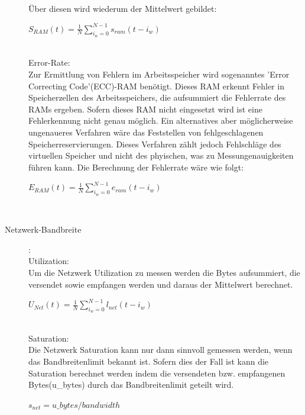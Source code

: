 \documentclass[a4paper,10pt]{scrartcl}
\begin{document}
\begin{description}
Über diesen wird wiederum der Mittelwert gebildet:\\

\begin{Huge}
\(
\displaystyle{S_{RAM}(t)=\frac{1}{N}{\sum\limits_{i_{w}=0}^{N-1} s_{ram}{(t-i_{w})}} }
\) 
\end{Huge}\\

Error-Rate:\\
Zur Ermittlung von Fehlern im Arbeitsspeicher wird sogenanntes 'Error Correcting Code'(ECC)-RAM benötigt. Dieses RAM erkennt Fehler in Speicherzellen des Arbeitsspeichers, die aufsummiert die Fehlerrate des RAMs ergeben. Sofern dieses RAM nicht eingesetzt wird ist eine Fehlerkennung nicht genau möglich. Ein alternatives aber möglicherweise ungenaueres Verfahren wäre das Feststellen von fehlgeschlagenen Speicherreservierungen. Dieses Verfahren zählt jedoch Fehlschläge des virtuellen Speicher und nicht des phyischen, was zu Messungenauigkeiten führen kann.
Die Berechnung der Fehlerrate wäre wie folgt:\\

\begin{Huge}
\(
\displaystyle{E_{RAM}(t)=\frac{1}{N}{\sum\limits_{i_{w}=0}^{N-1} e_{ram}{(t-i_{w})}} }
\) 
\end{Huge}\\

\pagebreak

\item[Netzwerk-Bandbreite]:\\
Utilization:\\
Um die Netzwerk Utilization zu messen werden die Bytes aufsummiert, die versendet sowie empfangen werden und daraus der Mittelwert berechnet.\\
\begin{Huge}
\(
\displaystyle{U_{Net}(t)=\frac{1}{N}{\sum\limits_{i_{w}=0}^{N-1} l_{net}{(t-i_{w})}} }
\) 
\end{Huge}\\

Saturation:\\
Die Netzwerk Saturation kann nur dann sinnvoll gemessen werden, wenn das Bandbreitenlimit bekannt ist. Sofern dies der Fall ist kann die Saturation berechnet werden indem die versendeten bzw. empfangenen Bytes(u\_bytes) durch das Bandbreitenlimit geteilt wird. \\

\begin{Huge}
\(
\displaystyle{s_{net}=u\_bytes/bandwidth}
\) 
\end{Huge}\\


\end{description}
\end{document}
